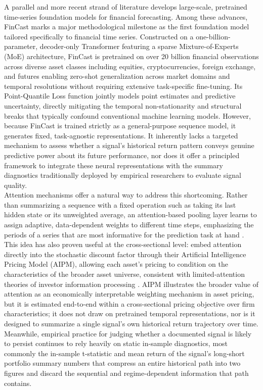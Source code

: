 \documentclass[pdflatex,sn-mathphys-num]{sn-jnl}%
\theoremstyle{thmstyleone}%
\theoremstyle{thmstyletwo}%
\theoremstyle{thmstylethree}%
\begin{document}
A parallel and more recent strand of literature develops large-scale, pretrained time-series foundation models for financial forecasting. Among these advances, FinCast \cite{zhu2025fincast} marks a major methodological milestone as the first foundation model tailored specifically to financial time series. Constructed on a one-billion-parameter, decoder-only Transformer featuring a sparse Mixture-of-Experts (MoE) architecture, FinCast is pretrained on over 20 billion financial observations across diverse asset classes including equities, cryptocurrencies, foreign exchange, and futures enabling zero-shot generalization across market domains and temporal resolutions without requiring extensive task-specific fine-tuning. Its Point-Quantile Loss function jointly models point estimates and predictive uncertainty, directly mitigating the temporal non-stationarity and structural breaks that typically confound conventional machine learning models. However, because FinCast is trained strictly as a general-purpose sequence model, it generates fixed, task-agnostic representations. It inherently lacks a targeted mechanism to assess whether a signal's historical return pattern conveys genuine predictive power about its future performance, nor does it offer a principled framework to integrate these neural representations with the summary diagnostics traditionally deployed by empirical researchers to evaluate signal quality.\\

Attention mechanisms offer a natural way to address this shortcoming. Rather than summarizing a sequence with a fixed operation such as taking its last hidden state or its unweighted average, an attention-based pooling layer learns to assign adaptive, data-dependent weights to different time steps, emphasizing the periods of a series that are most informative for the prediction task at hand \cite{vaswani2017attention}. This idea has also proven useful at the cross-sectional level: \citet{kelly2025artificial} embed attention directly into the stochastic discount factor through their Artificial Intelligence Pricing Model (AIPM), allowing each asset's pricing to condition on the characteristics of the broader asset universe, consistent with limited-attention theories of investor information processing \cite{hirshleifer2003limited, barber2008all}. AIPM illustrates the broader value of attention as an economically interpretable weighting mechanism in asset pricing, but it is estimated end-to-end within a cross-sectional pricing objective over firm characteristics; it does not draw on pretrained temporal representations, nor is it designed to summarize a single signal's own historical return trajectory over time. Meanwhile, empirical practice for judging whether a documented signal is likely to persist continues to rely heavily on static in-sample diagnostics, most commonly the in-sample t-statistic and mean return of the signal's long-short portfolio \cite{harvey2016and} summary numbers that compress an entire historical path into two figures and discard the sequential and regime-dependent information that path contains.\\
\end{document}
